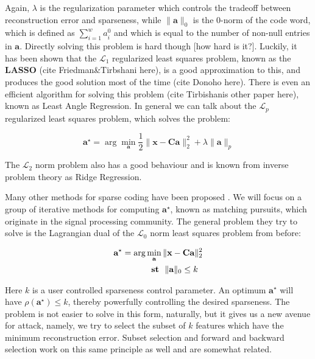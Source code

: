 \documentclass[12pt,a4paper,oneside,english]{UPBThesis}
\begin{document}
Again, $\lambda$ is the regularization parameter which controls the tradeoff between reconstruction error and sparseness, while $\|\textbf{a}\|_0$ is the $0$-norm of the code word, which is defined as $\sum_{i=1}^{w}a_i^0$ and which is equal to the number of non-null entries in $\textbf{a}$. Directly solving this problem is hard though [how hard is it?]. Luckily, it has been shown that the $\mathcal{L}_1$ regularized least squares problem, known as the \textbf{LASSO} (cite Friedman\&Tirbshani here), is a good approximation to this, and produces the good solution most of the time (cite Donoho here). There is even an efficient algorithm for solving this problem (cite Tirbishanis other paper here), known as Least Angle Regression. In general we can talk about the $\mathcal{L}_p$ regularized least squares problem, which solves the problem:

\begin{equation*}
\textbf{a}^{\star} = \arg\min_{\textbf{a}} \frac{1}{2} \| \textbf{x} - \textbf{C}\textbf{a} \|_2^2 + \lambda \| \textbf{a} \|_p
\end{equation*}

The $\mathcal{L}_2$ norm problem also has a good behaviour and is known from inverse problem theory as Ridge Regression.

Many other methods for sparse coding have been proposed \cite{undetermined-minimal-L1,sparse-coding-strategy-V1}. We will focus on a group of iterative methods for computing $\textbf{a}^\star$, known as matching pursuits, which originate in the signal processing community. The general problem they try to solve is the Lagrangian dual of the $\mathcal{L}_0$ norm least squares problem from before:

\begin{align*}
\textbf{a}^\star = \arg & \min_\textbf{a} \|\textbf{x} - \textbf{C}\textbf{a}\|_2^2 \\
& \text{~~\textbf{st}~~} \|\textbf{a}\|_0 \leq k
\end{align*}

Here $k$ is a user controlled sparseness control parameter. An optimum $\textbf{a}^\star$ will have $\rho(\textbf{a}^\star) \leq k$, thereby powerfully controlling the desired sparseness. The problem is not easier to solve in this form, naturally, but it gives us a new avenue for attack, namely, we try to select the subset of $k$ features which have the minimum reconstruction error. Subset selection and forward and backward selection work on this same principle as well and are somewhat related.
\end{document}
